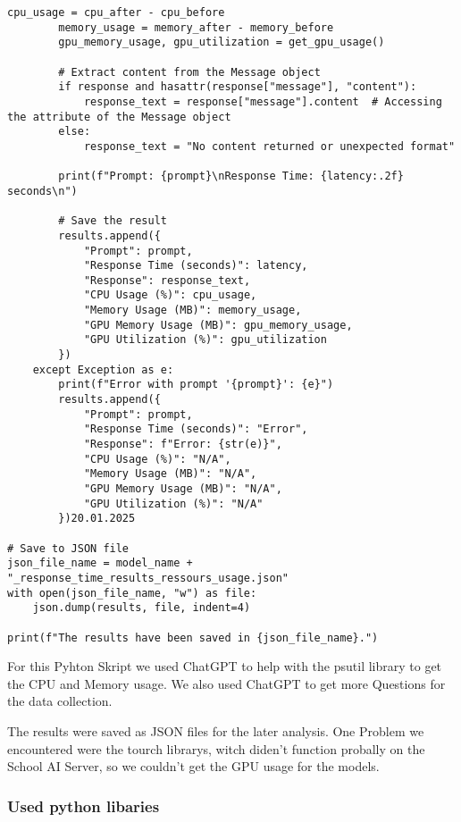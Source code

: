 \begin{lstlisting}[style=Python, caption={Python-quantitative-data-collection}, captionpos=b]
        cpu_usage = cpu_after - cpu_before
        memory_usage = memory_after - memory_before
        gpu_memory_usage, gpu_utilization = get_gpu_usage()

        # Extract content from the Message object
        if response and hasattr(response["message"], "content"):
            response_text = response["message"].content  # Accessing the attribute of the Message object
        else:
            response_text = "No content returned or unexpected format"

        print(f"Prompt: {prompt}\nResponse Time: {latency:.2f} seconds\n")

        # Save the result
        results.append({
            "Prompt": prompt,
            "Response Time (seconds)": latency,
            "Response": response_text,
            "CPU Usage (%)": cpu_usage,
            "Memory Usage (MB)": memory_usage,
            "GPU Memory Usage (MB)": gpu_memory_usage,
            "GPU Utilization (%)": gpu_utilization
        })
    except Exception as e:
        print(f"Error with prompt '{prompt}': {e}")
        results.append({
            "Prompt": prompt,
            "Response Time (seconds)": "Error",
            "Response": f"Error: {str(e)}",
            "CPU Usage (%)": "N/A",
            "Memory Usage (MB)": "N/A",
            "GPU Memory Usage (MB)": "N/A",
            "GPU Utilization (%)": "N/A"
        })20.01.2025

# Save to JSON file
json_file_name = model_name + "_response_time_results_ressours_usage.json"
with open(json_file_name, "w") as file:
    json.dump(results, file, indent=4)

print(f"The results have been saved in {json_file_name}.")

\end{lstlisting}


For this Pyhton Skript we used ChatGPT to help with the psutil library to get the CPU and Memory usage. 
We also used ChatGPT to get more Questions for the data collection. 

The results were saved as JSON files for the later analysis. One Problem we encountered were the tourch librarys, witch 
diden't function probally on the School AI Server, so we couldn't get the GPU usage for the models.

\subsubsection{Used python libaries}

